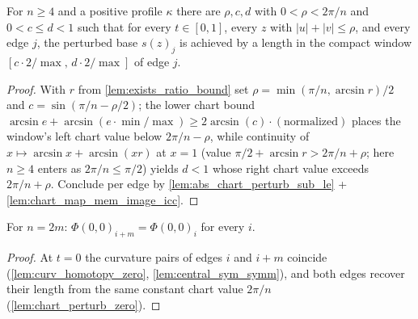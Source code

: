 \begin{lemma}

  \label{lem:exists_closing_cell_window}
  For $n \ge 4$ and a positive profile $\kappa$ there are $\rho, c, d$ with
  $0 < \rho < 2\pi/n$ and $0 < c \le d < 1$ such that for every $t \in [0,1]$,
  every $z$ with $|u| + |v| \le \rho$, and every edge $j$, the perturbed base
  $s(z)_j$ is achieved by a length in the compact window
  $[c \cdot 2/\max,\, d \cdot 2/\max]$ of edge $j$.
\end{lemma}
\begin{proof}

\leanok
  With $r$ from \cref{lem:exists_ratio_bound} set
  $\rho = \min(\pi/n, \arcsin r)/2$ and $c = \sin(\pi/n - \rho/2)$; the lower
  chart bound $\arcsin e + \arcsin(e \cdot \min/\max) \ge 2\arcsin(c)
  \cdot(\text{normalized})$ places the window's left chart value below
  $2\pi/n - \rho$, while continuity of $x \mapsto \arcsin x + \arcsin(xr)$ at
  $x = 1$ (value $\pi/2 + \arcsin r > 2\pi/n + \rho$; here $n \ge 4$ enters as
  $2\pi/n \le \pi/2$) yields $d < 1$ whose right chart value exceeds
  $2\pi/n + \rho$. Conclude per edge by
  \cref{lem:abs_chart_perturb_sub_le} + \cref{lem:chart_map_mem_image_icc}.
\end{proof}

\begin{lemma}

\leanok
[the center column at $t = 0$ is half-period symmetric]
  \label{lem:closing_cell_zero_symm}
  For $n = 2m$: $\Phi(0,0)_{i+m} = \Phi(0,0)_i$ for every $i$.
\end{lemma}
\begin{proof}

\leanok
  At $t = 0$ the curvature pairs of edges $i$ and $i+m$ coincide
  (\cref{lem:curv_homotopy_zero}, \cref{lem:central_sym_symm}), and both edges
  recover their length from the same constant chart value $2\pi/n$
  (\cref{lem:chart_perturb_zero}).
\end{proof}

